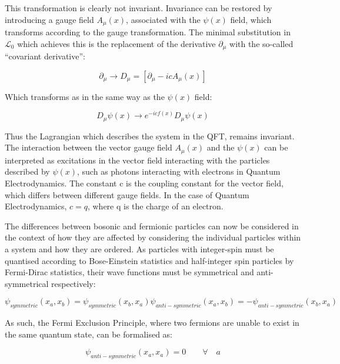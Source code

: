 This transformation is clearly not invariant. Invariance can be restored by introducing a gauge field $A_{\mu}(x)$, associated with the $\psi(x)$ field, which transforms according to the gauge transformation. 
The minimal substitution in $\mathcal{L}_{0}$ which achieves this is the replacement of the derivative $\partial_{\mu}$  with the so-called ``covariant derivative''\cite{QFT}:

\begin{equation}
\partial_{\mu} \rightarrow D_{\mu} = [ \partial_{\mu} - icA_{\mu}(x) ]
\end{equation}

Which transforms as in the same way as the $\psi(x)$ field:

\begin{equation}
D_{\mu}\psi(x) \rightarrow e^{-icf(x)}D_{\mu}\psi(x)
\end{equation}

Thus the Lagrangian which describes the system in the QFT, remains invariant. 
The interaction between the vector gauge field $A_{\mu}(x)$ and the $\psi(x)$ can be interpreted as excitations in the vector field interacting with the particles described by $\psi(x)$, such as photons interacting with electrons in Quantum Electrodynamics. 
The constant c is the coupling constant for the vector field, which differs between different gauge fields. 
In the case of Quantum Electrodynamics, $c = q$, where q is the charge of an electron\cite{QFT}.

The differences between bosonic and fermionic particles can now be considered in the context of how they are affected by considering the individual particles within a system and how they are ordered. 
As particles with integer-spin must be quantised according to Bose-Einstein statistics and half-integer spin particles by Fermi-Dirac statistics, their wave functions must be symmetrical and anti-symmetrical respectively\cite{QM}:

\begin{equation}
\psi_{symmetric}(x_{a},x_{b}) = \psi_{symmetric}(x_{b},x_{a})
\psi_{anti-symmetric}(x_{a},x_{b}) = -\psi_{anti-symmetric}(x_{b},x_{a})
\end{equation}

As such, the Fermi Exclusion Principle, where two fermions are unable to exist in the same quantum state, can be formalised as\cite{QM}:

\begin{equation}
\psi_{anti-symmetric}(x_{a},x_{a}) = 0 \qquad \forall \quad a
\end{equation}

